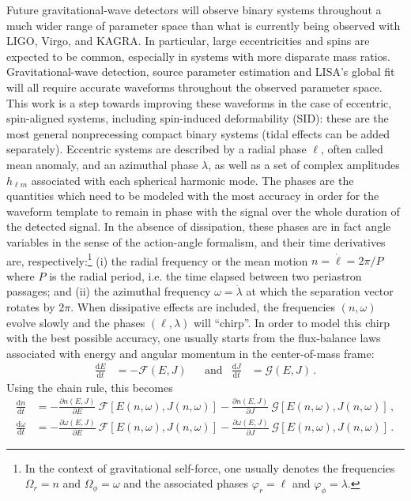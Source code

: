\documentclass[prd,superscriptaddress,preprintnumbers,tightenlines,nofootinbib, eqsecnum]{revtex4-2}
\renewcommand{\dd}{\mathrm{d}}
\begin{document}
Future gravitational-wave detectors will observe binary systems throughout a much wider range of parameter space than what is currently being observed with LIGO, Virgo, and KAGRA. In particular, large eccentricities and spins are expected to be common, especially in systems with more disparate mass ratios. Gravitational-wave detection, source parameter estimation and LISA's global fit will all require accurate waveforms throughout the observed parameter space. This work is a step towards improving these waveforms in the case of eccentric, spin-aligned systems, including spin-induced deformability (SID): these are the most general nonprecessing compact binary systems (tidal effects can be added separately). Eccentric systems are described by a radial phase $\ell$, often called mean anomaly, and an azimuthal phase $\lambda$, as well as a set of complex amplitudes $h_{\ell m}$ associated with each spherical harmonic mode. The phases are the quantities which need to be modeled with the most accuracy in order for the waveform template to remain in phase with the signal over the whole duration of the detected signal. In the absence of dissipation, these phases are in fact angle variables in the sense of the action-angle formalism, and their time derivatives are, respectively:\footnote{In the context of gravitational self-force, one usually denotes the frequencies $\Omega_r=n$ and $\Omega_\phi = \omega$ and the associated phases $\varphi_r=\ell$ and $\varphi_\phi=\lambda$.} (i) the radial frequency or the mean motion $n=\dot{\ell} = 2\pi/P$ where $P$ is the radial period, i.e. the time elapsed between two periastron passages; and (ii) the azimuthal frequency $\omega=\dot{\lambda}$ at which the separation vector rotates by $2\pi$. When dissipative effects are included, the frequencies $(n,\omega)$ evolve slowly and the phases $(\ell,\lambda)$ will ``chirp''. In order to model this chirp with the best possible accuracy, one usually starts from the flux-balance laws associated with energy and angular momentum in the center-of-mass frame:
\begin{align}\label{eq:flux_balance_EJ}
    \frac{\dd E}{\dd t}&= - \mathcal{F}(E,J) &&\text{and}&\frac{\dd J}{\dd t} &= \mathcal{G}(E,J)\,.
\end{align}
Using the chain rule, this becomes
\begin{subequations}\label{eq:orbital_element_evolution}\begin{align}
    \frac{\dd n}{\dd t}&= - \frac{\partial n(E,J)}{\partial E} \ \mathcal{F}\left[E(n,\omega),J(n,\omega)\right] - \frac{\partial n(E,J)}{\partial J} \ \mathcal{G}\left[E(n,\omega),J(n,\omega)\right] \,,\\
    \frac{\dd \omega}{\dd t}&= - \frac{\partial \omega(E,J)}{\partial E} \ \mathcal{F}\left[E(n,\omega),J(n,\omega)\right] - \frac{\partial \omega(E,J)}{\partial J} \ \mathcal{G}\left[E(n,\omega),J(n,\omega)\right] \,. 
\end{align}\end{subequations}
\end{document}
